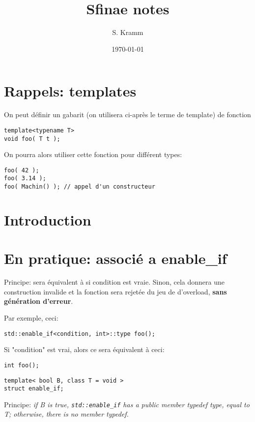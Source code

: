 \documentclass[11pt,a4paper,landscape,twocolumn]{article}
\author{S. Kramm}
\title{Sfinae notes}
\date{\today}
\begin{document}
\maketitle


\section{Rappels: templates}

On peut définir un gabarit (on utilisera ci-après le terme de template) de fonction

\begin{lstlisting}
template<typename T>
void foo( T t );
\end{lstlisting}

On pourra alors utiliser cette fonction pour différent types:
\begin{lstlisting}
foo( 42 );
foo( 3.14 );
foo( Machin() ); // appel d'un constructeur
\end{lstlisting}





\section{Introduction}



\section{En pratique: associé a enable\_if}

Principe:  sera équivalent à  si condition est vraie.
Sinon, cela donnera une construction invalide et la fonction sera rejetée du jeu de d'overload, {\bf sans génération d'erreur}.

Par exemple, ceci:
\begin{lstlisting}
std::enable_if<condition, int>::type foo();
\end{lstlisting}
Si "condition" est vrai, alors ce sera équivalent à ceci:
\begin{lstlisting}
int foo();
\end{lstlisting}


\begin{lstlisting}
template< bool B, class T = void >
struct enable_if;
\end{lstlisting}

Principe:
{\em if B is true, {\tt std::enable\_if} has a public member typedef type, equal to T; otherwise, there is no member typedef. }
\end{document}
